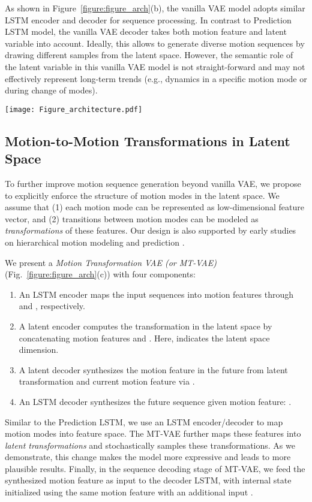 \documentclass[runningheads]{llncs}
\newcommand{\cutsubsectionup}{\vspace*{-0.1in}}
\newcommand{\cutsubsectiondown}{\vspace*{-0.07in}}
\begin{document}
As shown in Figure~\ref{figure:figure_arch}(b), the vanilla VAE model adopts similar LSTM encoder and decoder for sequence processing. 
In contrast to Prediction LSTM model, the vanilla VAE decoder takes both motion feature  and latent variable  into account.
Ideally, this allows to generate diverse motion sequences by drawing different samples from the latent space.
However, the semantic role of the latent variable  in this vanilla VAE model is not straight-forward and may not effectively represent long-term trends (e.g., dynamics in a specific motion mode or during change of modes).


\begin{figure*}[t]
\centering
\texttt{[image: Figure\_architecture.pdf]}
\caption{Illustrations of different models for motion sequence generation.  indicates the hidden state of the Encoder LSTM at time . 
}
\label{figure:figure_arch}
\vspace*{-0.2in}
\end{figure*}

\cutsubsectionup
\subsection{Motion-to-Motion Transformations in Latent Space}
\label{sec:tcvae_transformation}
\cutsubsectiondown

To further improve motion sequence generation beyond vanilla VAE, we propose to explicitly enforce the structure of motion modes in the latent space.
We assume that (1) each motion mode can be represented as low-dimensional feature vector, and (2) transitions between motion modes can be modeled as \textit{transformations} of these features.
Our design is also supported by early studies on hierarchical motion modeling and prediction \cite{bregler1997learning,smith2013sources,lan2014hierarchical}.

We present a \emph{Motion Transformation VAE (or MT-VAE)} (Fig.~\ref{figure:figure_arch}(c)) with four components:
\begin{enumerate}
\item An LSTM encoder  maps the input sequences into motion features through  and , respectively.
\item A latent encoder  computes the transformation in the latent space  by concatenating motion features  and .
Here,  indicates the latent space dimension.
\item A latent decoder  synthesizes the motion feature in the future from latent transformation  and current motion feature  via .
\item An LSTM decoder  synthesizes the future sequence given motion feature: .
\end{enumerate}
Similar to the Prediction LSTM, we use an LSTM encoder/decoder to map motion modes into feature space. The MT-VAE further maps these features into \emph{latent transformations} and stochastically samples these transformations. As we demonstrate, this change makes the model more expressive and leads to more plausible results. Finally, in the sequence decoding stage of MT-VAE, we feed the synthesized motion feature  as input to the decoder LSTM, with internal state initialized using the same motion feature  with an additional input .
\end{document}
